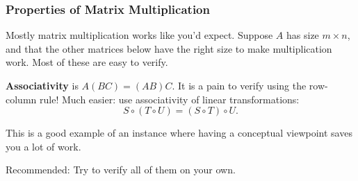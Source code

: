 \begin{frame}
\pause\vskip -.3cm
\begin{eg}
  \null
  \vskip-.8cm
  \begin{webonly}
  \small\[\fboxsep=0pt
  \def\g{\textcolor{green!70!black}}
  \def\b{\textcolor{blue!50}}
  \begin{aligned}
    \mat{\g1 \g2 \g3; 4 5 6}
    \mat{\b1 -3; \b2 -2; \b3 -1}
    &= \mat{\g1\cdot\b1+\g2\cdot\b2+\g3\cdot\b3 \fbox{\phantom 8};
      \fbox{\phantom 8} \fbox{\phantom 8}}
    = \mat{14 \fbox{\phantom 8}; \fbox{\phantom 8} \fbox{\phantom 8}} \\
    \mat{1 2 3; \g4 \g5 \g6}
    \mat{\b1 -3; \b2 -2; \b3 -1}
    &= \mat{\fbox{\phantom 8} \fbox{\phantom 8};
      \g4\cdot\b1+\g5\cdot\b2+\g6\cdot\b3 \fbox{\phantom 8}}
    = \mat{\fbox{\phantom 8} \fbox{\phantom 8}; 32 \fbox{\phantom 8}}
  \end{aligned}\]
  \end{webonly}
\end{eg}

\end{frame}



\begin{frame}
\frametitle{Properties of Matrix Multiplication}

Mostly matrix multiplication works like you'd expect.  Suppose $A$ has size
$m\times n$, and that the other matrices below have the right size to make
multiplication work. 
\webonlycmd{
  \[\syseq{A(BC) = (AB)C\hfill, \qquad,
    A(B+C) = ({AB+AC});
    (B+C)A = BA+CA \qquad,
    c(AB) = (cA)B\hfill ;
    c(AB) = A(cB)\hfill, \qquad,
    I_nA = A\hfill;
    AI_m = A\hfill}
\]}\pause
Most of these are easy to verify.  

\pause\medskip
\textbf{Associativity} is $A(BC) = (AB)C$.  It is a pain to verify using the row-column
rule!
\pause
Much easier: use associativity of linear transformations:
\[ S\circ(T\circ U) = (S\circ T)\circ U. \]

\pause\medskip
This is a good example of an instance where having a conceptual viewpoint saves
you a lot of work.

\pause\medskip
\alert{Recommended:} Try to verify all of them on your own.

\end{frame}



